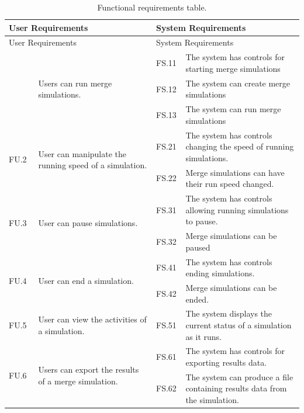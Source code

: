 \begin{longtable}{|p{0.1\linewidth}|p{0.4\linewidth}|p{0.1\linewidth}|p{0.4\linewidth}|}
\caption{Functional requirements table.}\label{tab:functionalRequirements}\\
\hline
\multicolumn{2}{|l|}{User Requirements} & \multicolumn{2}{l|}{System Requirements} \\
\hline
\endfirsthead

\hline
\multicolumn{2}{|l|}{User Requirements} & \multicolumn{2}{l|}{System Requirements} \\
\hline
\endhead

\hline
\endfoot

\hline
\endlastfoot

\multirow{3}{*}{FU.1} & \multirow{3}{*}{\parbox{\linewidth}{Users can run merge simulations.}} 
 & FS.11 & The system has controls for starting merge simulations \\
 &  & FS.12 & The system can create merge simulations \\
 &  & FS.13 & The system can run merge simulations \\
\hline
\multirow{2}{*}{FU.2} & \multirow{2}{*}{\parbox{\linewidth}{User can manipulate the running speed of a simulation.}}
 & FS.21 & The system has controls changing the speed of running simulations. \\
 &  & FS.22 & Merge simulations can have their run speed changed. \\ 
\hline
\multirow{2}{*}{FU.3} & \multirow{2}{*}{\parbox{\linewidth}{User can pause simulations.}}
 & FS.31 & The system has controls allowing running simulations to pause. \\
 &  & FS.32 & Merge simulations can be paused \\ 
\hline
\multirow{2}{*}{FU.4} & \multirow{2}{*}{\parbox{\linewidth}{User can end a simulation.}}
 & FS.41 & The system has controls ending simulations. \\
 &  & FS.42 & Merge simulations can be ended. \\ 
\hline
FU.5 & User can view the activities of a simulation. & FS.51 & The system displays the current status of a simulation as it runs. \\
\hline
\multirow{9}{*}{FU.6} & \multirow{9}{*}{\parbox{\linewidth}{Users can export the results of a merge simulation.}}
 & FS.61 & The system has controls for exporting results data. \\
 &  & FS.62 & The system can produce a file containing results data from the simulation. \\

\end{longtable}
